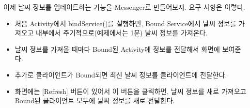 이제 날씨 정보를 업데이트하는 기능을 Messenger로 만들어보자. 요구 사항은 이렇다.
\begin{itemize}
\item 처음 Activity에서 bindService()를 실행하면, Bound Service에서 날씨 정보를 가져오고 내부에서 주기적으로(예제에서는 1분) 날씨 정보를 가져온다.
\item 날씨 정보를 가져올 때마다 Bound된 Activity에 정보를 전달해서 화면에 보여준다.
\item 추가로 클라이언트가 Bound되면 최신 날씨 정보를 클라이언트에 전달한다.
\item 화면에는 [Refresh] 버튼이 있어서 이 버튼을 클릭하면, 날씨 정보를 새로 가져오고 Bound된 클라이언트 모두에 날씨 정보를 새로 전달한다.
\end{itemize}


